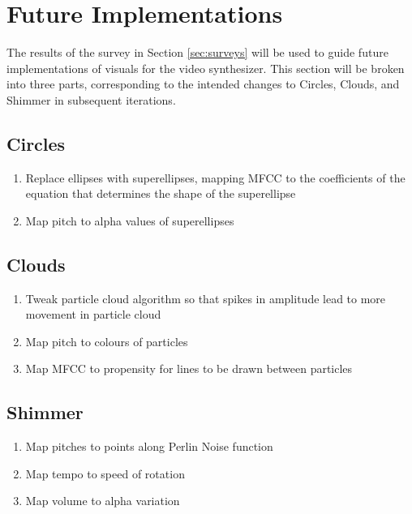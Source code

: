 \documentclass[../initial_thesis.tex]{subfiles}
\begin{document}
\section{Future Implementations}
The results of the survey in Section \ref{sec:surveys} will be used to guide future implementations of visuals for the video synthesizer. This section will be broken into three parts, corresponding to the intended changes to Circles, Clouds, and Shimmer in subsequent iterations.

\subsection{Circles}
\begin{enumerate}
\item {Replace ellipses with superellipses, mapping MFCC to the coefficients of the equation that determines the shape of the superellipse}
\item {Map pitch to alpha values of superellipses}
\end{enumerate}
\subsection{Clouds}
\begin{enumerate}
\item {Tweak particle cloud algorithm so that spikes in amplitude lead to more movement in particle cloud}
\item {Map pitch to colours of particles}
\item {Map MFCC to propensity for lines to be drawn between particles}
\end{enumerate}
\subsection{Shimmer}
\begin{enumerate}
\item {Map pitches to points along Perlin Noise function}
\item {Map tempo to speed of rotation}
\item {Map volume to alpha variation}
\end{enumerate}
\end{document}
